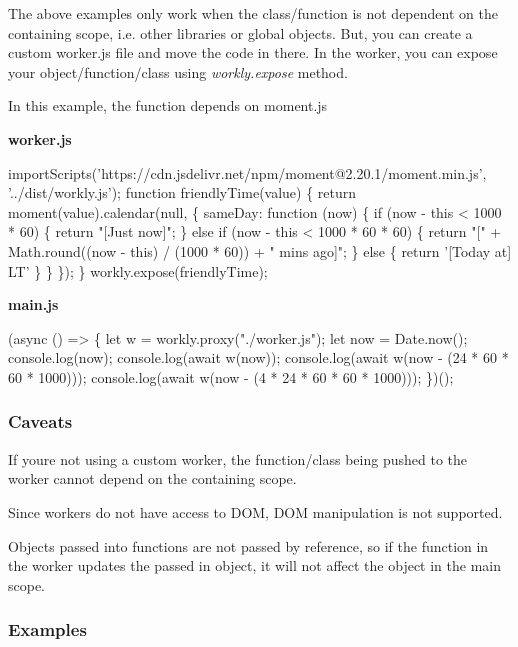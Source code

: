 The above examples only work when the class/function is not dependent on the containing scope, i.\+e. other libraries or global objects. But, you can create a custom worker.\+js file and move the code in there. In the worker, you can expose your object/function/class using {\itshape workly.\+expose} method.

In this example, the function depends on moment.\+js

{\bfseries worker.\+js} 
\begin{DoxyCode}
importScripts('https://cdn.jsdelivr.net/npm/moment@2.20.1/moment.min.js', '../dist/workly.js');
function friendlyTime(value) \{
  return moment(value).calendar(null, \{
    sameDay: function (now) \{
      if (now - this < 1000 * 60) \{
        return "[Just now]";
      \} else if (now - this < 1000 * 60 * 60) \{
        return "[" + Math.round((now - this) / (1000 * 60)) + " mins ago]";
      \} else \{
        return '[Today at] LT'
      \}
    \}
  \});
\}
workly.expose(friendlyTime);
\end{DoxyCode}
 {\bfseries main.\+js} 
\begin{DoxyCode}
(async () => \{
  let w = workly.proxy("./worker.js");
  let now = Date.now();
  console.log(now);
  console.log(await w(now));
  console.log(await w(now - (24 * 60 * 60 * 1000)));
  console.log(await w(now - (4 * 24 * 60 * 60 * 1000)));
\})();
\end{DoxyCode}


\subsubsection*{Caveats}


\begin{DoxyItemize}
\item If you\textquotesingle{}re not using a custom worker, the function/class being pushed to the worker cannot depend on the containing scope.
\item Since workers do not have access to D\+OM, D\+OM manipulation is not supported.
\item Objects passed into functions are not passed by reference, so if the function in the worker updates the passed in object, it will not affect the object in the main scope.
\end{DoxyItemize}

\subsubsection*{Examples}

